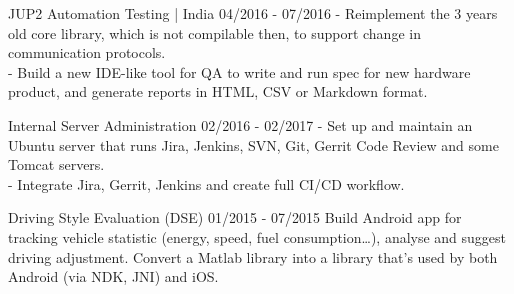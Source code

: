 {  \event
  {JUP2 Automation Testing | India}
  {04/2016 - 07/2016}
  {
    - Reimplement the 3 years old core library, which is not compilable then, to
      support change in communication protocols.
      \\
      - Build a new IDE-like tool for QA to write and run spec for new hardware
      product, and generate reports in HTML, CSV or Markdown format.
  }

  \event
  {Internal Server Administration}
  {02/2016 - 02/2017}
  {
    - Set up and maintain an Ubuntu server that runs Jira, Jenkins,
      SVN, Git, Gerrit Code Review and some Tomcat servers.\\
        - Integrate Jira, Gerrit, Jenkins and create full CI/CD workflow.
  }

  \event
  {Driving Style Evaluation (DSE)}
  {01/2015 - 07/2015}
  {
    Build Android app for tracking vehicle statistic (energy, speed, fuel
        consumption\dots), analyse and suggest driving adjustment. Convert a Matlab
      library into a \cpp{} library that's used by both Android (via NDK, JNI) and
      iOS.
  }
}
